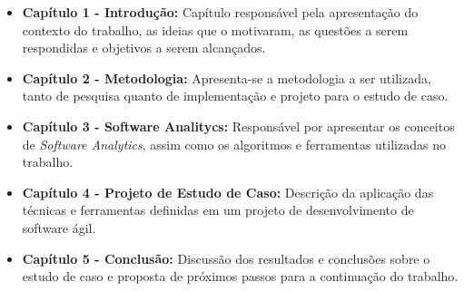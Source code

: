 \begin{itemize}
    \item \textbf{Capítulo 1 - Introdução:} Capítulo responsável pela apresentação do contexto do trabalho, as ideias que o motivaram, as questões a serem respondidas e objetivos a serem alcançados.
    \item \textbf{Capítulo 2 - Metodologia:} Apresenta-se a metodologia a ser utilizada, tanto de pesquisa quanto de implementação e projeto para o estudo de caso.
    \item \textbf{Capítulo 3 - Software Analitycs:} Responsável por apresentar os conceitos de \textit{Software Analytics}, assim como os algoritmos e ferramentas utilizadas no trabalho.
    \item \textbf{Capítulo 4 - Projeto de Estudo de Caso:} Descrição da aplicação das técnicas e ferramentas definidas em um projeto de desenvolvimento de software ágil.
    \item \textbf{Capítulo 5 - Conclusão:} Discussão dos resultados e conclusões sobre o estudo de caso e proposta de próximos passos para a continuação do trabalho.
\end{itemize}
